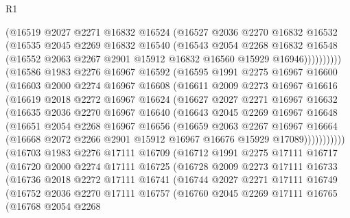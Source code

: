 \begin{lexlean}{R1}
\begin{coremodule}
              (@16519
                @2027
                @2271
                @16832
                @16524
                (@16527
                  @2036
                  @2270
                  @16832
                  @16532
                  (@16535
                    @2045
                    @2269
                    @16832
                    @16540
                    (@16543
                      @2054
                      @2268
                      @16832
                      @16548
                      (@16552 @2063 @2267 @2901 @15912 @16832 @16560 @15929 @16946))))))))))
    (@16586
      @1983
      @2276
      @16967
      @16592
      (@16595
        @1991
        @2275
        @16967
        @16600
        (@16603
          @2000
          @2274
          @16967
          @16608
          (@16611
            @2009
            @2273
            @16967
            @16616
            (@16619
              @2018
              @2272
              @16967
              @16624
              (@16627
                @2027
                @2271
                @16967
                @16632
                (@16635
                  @2036
                  @2270
                  @16967
                  @16640
                  (@16643
                    @2045
                    @2269
                    @16967
                    @16648
                    (@16651
                      @2054
                      @2268
                      @16967
                      @16656
                      (@16659
                        @2063
                        @2267
                        @16967
                        @16664
                        (@16668 @2072 @2266 @2901 @15912 @16967 @16676 @15929 @17089)))))))))))
    (@16703
      @1983
      @2276
      @17111
      @16709
      (@16712
        @1991
        @2275
        @17111
        @16717
        (@16720
          @2000
          @2274
          @17111
          @16725
          (@16728
            @2009
            @2273
            @17111
            @16733
            (@16736
              @2018
              @2272
              @17111
              @16741
              (@16744
                @2027
                @2271
                @17111
                @16749
                (@16752
                  @2036
                  @2270
                  @17111
                  @16757
                  (@16760
                    @2045
                    @2269
                    @17111
                    @16765
                    (@16768
                      @2054
                      @2268

\end{coremodule}
\end{lexlean}
